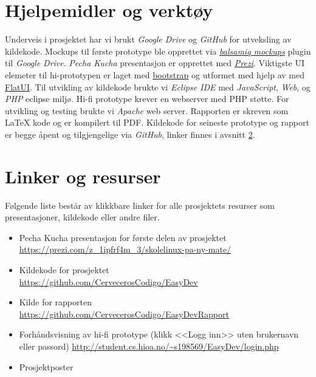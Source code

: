 \section{Hjelpemidler og verktøy} \label{sec:hjelpogverkt}
Underveis i prosjektet har vi brukt \textit{Google Drive} og \textit{GitHub} for utveksling av kildekode. Mockups til første prototype ble opprettet via \href{https://balsamiq.com/}{\textit{balsamiq mockups}} plugin til \textit{Google Drive}. \textit{Pecha Kucha} presentasjon er opprettet med \href{https://prezi.com/z_1ipfrf4m_3/skolelinux-pa-ny-mate/}{\textit{Prezi}}. Viktigste UI elemeter til hi-prototypen er laget med \href{http://getbootstrap.com/}{bootstrap} og utformet med hjelp av med \href{http://designmodo.github.io/Flat-UI/}{FlatUI}. Til utvikling av kildekode brukte vi \textit{Eclipse IDE} med \textit{JavaScript}, \textit{Web}, og \textit{PHP} eclipse miljø. Hi-fi prototype krever en webserver med PHP støtte. For utvikling og testing brukte vi \textit{Apache} web server.
Rapporten er skreven som \LaTeX{} kode og er kompilert til PDF.
Kildekode for seineste prototype og rapport er begge åpent og tilgjengelige via \textit{GitHub}, linker finnes i avsnitt \ref{sec:linker}.

\section{Linker og resurser} \label{sec:linker}
Følgende liste består av klikkbare linker for alle prosjektets resurser som presentasjoner, kildekode eller andre filer. 
\begin{itemize}
\item Pecha Kucha presentasjon for første delen av prosjektet\\ \url{https://prezi.com/z_1ipfrf4m_3/skolelinux-pa-ny-mate/}
\item Kildekode for prosjektet\\
\url{https://github.com/CervecerosCodigo/EasyDev}
\item Kilde for rapporten\\
\url{https://github.com/CervecerosCodigo/EasyDevRapport}
\item Forhåndsvisning av hi-fi prototype (klikk <<Logg inn>> uten brukernavn eller passord)
\url{http://student.cs.hioa.no/~s198569/EasyDev/login.php}
\item Prosjektposter
\end{itemize}
